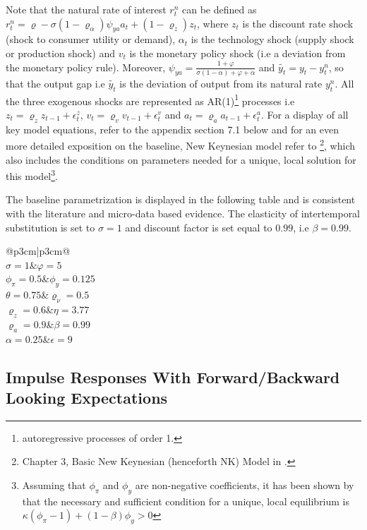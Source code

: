 \documentclass[12pt]{article}
\makeatletter
\newcommand\Taccount[3][3cm]%
{{\renewcommand\arraystretch{1.3}%
		\begin{adjustbox}{width=0.4\textwidth}
		\begin{tabular}[t]{@{}p{#1}|p{#1}@{}}
			\multicolumn{2}{@{}c@{}}{#2}\\
			\hline
			\hline
			#3
		\end{tabular}%
		\end{adjustbox}
	
}}
\newcommand{\1}{\mathbbm 1}
\renewcommand{\rho}{\varrho}
\makeatother
\begin{document}
Note that the natural rate of interest $r_{t}^{n}$ can be defined as $r_{t}^{n} = \rho - \sigma (1 - \rho_{\alpha}) \psi_{ya} a_{t} + (1 - \rho_{z}) z_{t}$, where $z_{t}$ is the discount rate shock (shock to consumer utility or demand), $\alpha_{t}$ is the technology shock (supply shock or production shock) and $v_{t}$ is the monetary policy shock (i.e a deviation from the monetary policy rule). Moreover, $\psi_{ya} = \frac{1 + \varphi}{\sigma (1 - \alpha) + \varphi + \alpha}$ and $\widetilde{y_{t}} = y_{t} - y_{t}^{n}$, so that the output gap i.e $\widetilde{y_{t}}$ is the deviation of output from its natural rate $ y_{t}^{n}$. All the three exogenous shocks are represented as AR(1)\footnote{autoregressive processes of order 1.} processes i.e $z_{t} = \rho_{z} z_{t-1} + \epsilon_{t}^{z}$, $v_{t} = \rho_{v} v_{t-1} + \epsilon_{t}^{v}$ and $a_{t} = \rho_{a} a_{t-1} + \epsilon_{t}^{a}$. For a display of all key model equations, refer to the appendix section 7.1 below and for an even more detailed exposition on the baseline, New Keynesian model refer to \cite{gali2015book}\footnote{Chapter 3, Basic New Keynesian (henceforth NK) Model in \cite{gali2015book}.}, which also includes the conditions on parameters needed for a unique, local solution for this model\footnote{Assuming that $\phi_{\pi}$ and $\phi_{y}$ are non-negative coefficients, it has been shown by \cite{bullard2002learning} that the necessary and sufficient condition for a unique, local equilibrium is $\kappa (\phi_{\pi} - 1) + (1 - \beta) \phi_{y} > 0$}. 

The baseline parametrization is displayed in the following table and is consistent with the literature and micro-data based evidence. The elasticity of intertemporal substitution is set to $\sigma = 1$ and discount factor is set equal to $0.99$, i.e $\beta = 0.99$.

	\begin{center}
	\Taccount{NK Model Parameters}{$\sigma = 1$&$\varphi = 5$\\$\phi_{\pi} = 0.5$&$\phi_{y}=0.125$\\$\theta = 0.75$&$\rho_{\nu} = 0.5$\\$\rho_{z} = 0.6$&$\eta=3.77$\\$\rho_{a} = 0.9$&$\beta=0.99$\\$\alpha=0.25$&$\epsilon=9$}
\end{center}


\subsection{Impulse Responses With Forward/Backward Looking Expectations}
\end{document}
